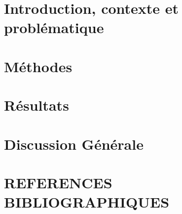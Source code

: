 \documentclass[11pt,a4paper]{book} %
\begin{document}


\renewcommand{\addvspace}[1]{\origaddvspace{#1}}

\mainmatter %
\pagestyle{main}


\part{Introduction, contexte et problématique}
\pagestyle{preambule}


\part{Méthodes}
\pagestyle{preambule}


\part{Résultats}
\pagestyle{titre_chapitre}

\clearpage

\pagestyle{titre_chapitre}

\clearpage

\pagestyle{titre_chapitre}

\clearpage

%

%

\part{Discussion Générale}
\pagestyle{preambule}




\pagestyle{references}
\part*{REFERENCES BIBLIOGRAPHIQUES}
\end{document}
